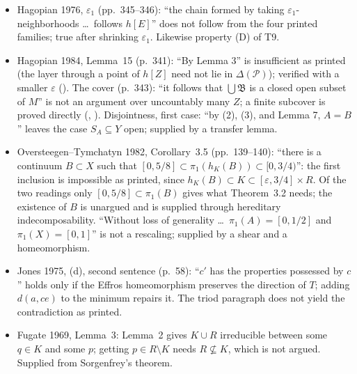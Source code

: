 \documentclass[11pt]{article}
\begin{document}
\begin{itemize}
  are minimal, each element of the decomposition of $E$ (except possibly $k^{-1}(1)$) is an element
  of the decomposition of $F$.'' Minimality gives it only for layers in $d^{-1}(u)$ with $u<s$
  (); a plane model without homogeneity has a layer swallowed.
  Verified in a strong form through Lemma~5 ().
\item Hagopian 1976, $\varepsilon_1$ (pp.~345--346): ``the chain formed by taking
  $\varepsilon_1$-neighborhoods \ldots\ follows $h[E]$'' does not follow from the four printed
  families; true after shrinking $\varepsilon_1$. Likewise property (D) of T9.
\item Hagopian 1984, Lemma~15 (p.~341): ``By Lemma 3'' is insufficient as printed (the layer through
  a point of $h[Z]$ need not lie in $\Delta(\mathcal P)$); verified with a smaller $\varepsilon$
  (). The cover (p.~343): ``it follows that $\bigcup\mathfrak B$ is a closed
  open subset of $M$'' is not an argument over uncountably many $Z$; a finite subcover is proved
  directly (, ). Disjointness, first case:
  ``by (2), (3), and Lemma 7, $A=B$'' leaves the case $S_A\subseteq Y$ open; supplied by a transfer
  lemma.
\item Oversteegen--Tymchatyn 1982, Corollary~3.5 (pp.~139--140): ``there is a continuum $B\subset
  X$ such that $[0,5/8]\subset\pi_1(h_K(B))\subset[0,3/4)$'': the first inclusion is impossible as
  printed, since $h_K(B)\subset K\subset[\varepsilon,3/4]\times R$. Of the two readings only
  $[0,5/8]\subset\pi_1(B)$ gives what Theorem~3.2 needs; the existence of $B$ is unargued and is
  supplied through hereditary indecomposability. ``Without loss of generality \ldots\
  $\pi_1(A)=[0,1/2]$ and $\pi_1(X)=[0,1]$'' is not a rescaling; supplied by a shear and a
  homeomorphism.
\item Jones 1975, (d), second sentence (p.~58): ``$c'$ has the properties possessed by $c$'' holds
  only if the Effros homeomorphism preserves the direction of $T$; adding $d(a,ce)$ to the minimum
  repairs it. The triod paragraph does not yield the contradiction as printed.
\item Fugate 1969, Lemma~3: Lemma~2 gives $K\cup R$ irreducible between some $q\in K$ and some $p$;
  getting $p\in R\setminus K$ needs $R\not\subseteq K$, which is not argued. Supplied from
  Sorgenfrey's theorem.
\end{itemize}

\end{document}

